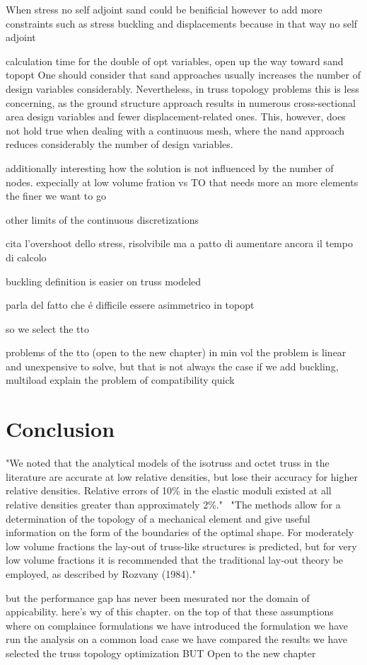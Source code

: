 When stress no self adjoint \gls{sand} could be benificial however to add more constraints such as stress buckling and displacements because in that way no self adjoint

calculation time for the double of opt variables, open up the way toward sand topopt One should consider that \gls{sand} approaches usually increases the number of design variables considerably. Nevertheless, in truss topology problems this is less concerning, as the ground structure approach results in numerous cross-sectional area design variables and fewer displacement-related ones. This, however, does not hold true when dealing with a continuous mesh, where the \gls{nand} approach reduces considerably the number of design variables.

additionally interesting how the solution is not influenced by the number of nodes. expecially at low volume fration vs TO that needs more an more elements the finer we want to go

other limits of the continuous discretizations

cita l'overshoot dello stress, risolvibile ma a patto di aumentare ancora il tempo di calcolo

buckling definition is easier on truss modeled

parla del fatto che é difficile essere asimmetrico in topopt

so we select the tto

problems of the tto (open to the new chapter)
in min vol the problem is linear and unexpensive to solve, but that is not always the case if we add buckling, multiload
explain the problem of compatibility quick

\section{Conclusion}
"We noted that the analytical models of the isotruss and octet truss in the literature are accurate at low relative densities, but lose their accuracy for higher relative densities. Relative errors of 10\% in the elastic moduli existed at all relative densities greater than approximately 2\%."~
"The methods allow for a determination of the topology of a mechanical element and give useful information on the form of the boundaries of the optimal shape. For moderately low volume fractions the lay-out of truss-like structures is predicted, but for very low volume fractions it is recommended that the traditional lay-out theory be employed, as described by Rozvany (1984)."~

but the performance gap has never been mesurated nor the domain of appicability. here's wy of this chapter. on the top of that these assumptions where on complaince formulations
we have introduced the formulation
we have run the analysis on a common load case
we have compared the results
we have selected the truss topology optimization
BUT
Open to the new chapter
